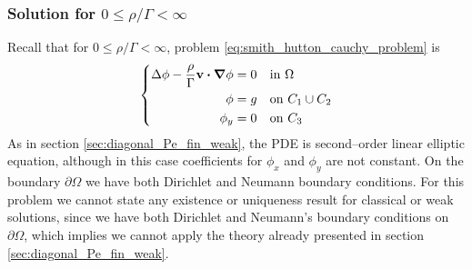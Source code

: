 \subsubsection{Solution for \texorpdfstring{$0 \leq \rho / \Gamma <
\infty$}{finite rho/Gamma quotient}}

Recall that for $0 \leq \rho / \Gamma < \infty$, problem
\eqref{eq:smith_hutton_cauchy_problem} is 
\begin{equation*}
	\left\{
	\begin{aligned}
		\Delta \phi - \frac{\rho}{\Gamma} \vb{v} \vdot \grad{\phi} &= 0 &
		&\text{in } \Omega \\
		\phi &= g & 
		&\text{on } C_1 \cup C_2 \\
		\phi_y &= 0 & 
		&\text{on } C_3
	\end{aligned}
	\right.
\end{equation*}
As in section \ref{sec:diagonal_Pe_fin_weak}, the PDE is second--order linear
elliptic equation, although in this case coefficients for $\phi_x$ and $\phi_y$
are not constant. On the boundary $\partial \Omega$ we have both Dirichlet and
Neumann boundary conditions. For this problem we cannot state any existence or
uniqueness result for classical or weak solutions, since we have both Dirichlet
and Neumann's boundary conditions on $\partial \Omega$, which implies we cannot
apply the theory already presented in section \ref{sec:diagonal_Pe_fin_weak}.